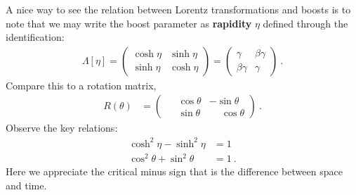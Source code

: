 \begin{example}
A nice way to see the relation between Lorentz transformations and boosts is to note that we may write the boost parameter as \textbf{rapidity} $\eta$ defined through the identification:
\begin{align}
    \Lambda[\eta] = 
    \begin{pmatrix}
        \cosh \eta & \sinh \eta \\
        \sinh \eta & \cosh \eta
    \end{pmatrix}
    =
    \begin{pmatrix}
        \gamma & \beta\gamma \\
        \beta \gamma & \gamma
    \end{pmatrix} \ .
\end{align}
Compare this to a rotation matrix,
\begin{align}
    R(\theta) &=
    \begin{pmatrix}
        \phantom{+}\cos \theta & -\sin\theta \\
        \phantom{+}\sin \theta & \phantom{+}\cos\theta
    \end{pmatrix} \ .
    \label{eq:eg:rotations}
\end{align}
Observe the key relations:
\begin{align}
    \cosh^2 \eta - \sinh^2 \eta &= 1\\
    \cos^2 \theta + \sin^2 \theta &=1 \ .
\end{align}
Here we appreciate the critical minus sign that is the difference between space and time.\sidenotemark
\end{example}

